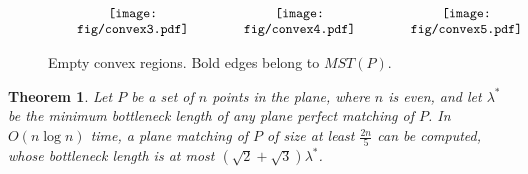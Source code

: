 \documentclass[11pt,a4paper]{article}
\newcommand{\btopt}{\lambda^*}
\newtheorem{theorem}{Theorem}
\begin{document}
\begin{figure}[ht]
  \centering
\setlength{\tabcolsep}{0in}
  $\begin{tabular}{ccc}
  \multicolumn{1}{m{.33\columnwidth}}{\centering\texttt{[image: fig/convex3.pdf]}}
  &\multicolumn{1}{m{.33\columnwidth}}{\centering\texttt{[image: fig/convex4.pdf]}}
  &\multicolumn{1}{m{.33\columnwidth}}{\centering\texttt{[image: fig/convex5.pdf]}}
  \end{tabular}$
  \caption{Empty convex regions. Bold edges belong to $MST(P)$.}
\label{convex-disjoint-fig}
\end{figure}

\begin{theorem}
Let $P$ be a set of $n$ points in the plane, where $n$ is even, and let $\btopt$ be the minimum bottleneck length of any plane perfect matching of $P$. In $O(n\log n)$ time, a plane matching of $P$ of size at least $\frac{2n}{5}$ can be computed, whose bottleneck length is at most $(\sqrt{2}+\sqrt{3})\btopt$.
\end{theorem}
\end{document}
